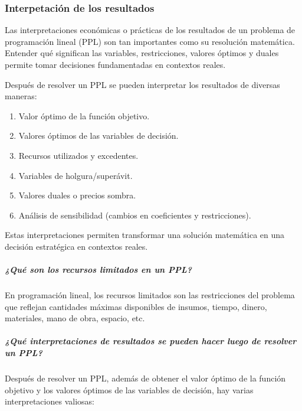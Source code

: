 \subsubsection{Interpetación de los resultados}

Las interpretaciones económicas o prácticas de los resultados de un problema de programación lineal (PPL) son tan importantes como su resolución matemática. Entender qué significan las variables, restricciones, valores óptimos y duales permite tomar decisiones fundamentadas en contextos reales.

Después de resolver un PPL se pueden interpretar los resultados de diversas maneras:
\begin{enumerate}
  \item Valor óptimo de la función objetivo.
  \item Valores óptimos de las variables de decisión.
  \item Recursos utilizados y excedentes.
  \item Variables de holgura/superávit.
  \item Valores duales o precios sombra.
  \item Análisis de sensibilidad (cambios en coeficientes y restricciones).
\end{enumerate}

Estas interpretaciones permiten transformar una solución matemática en una decisión estratégica en contextos reales.

\subparagraph{¿Qué son los recursos limitados en un PPL?}

En programación lineal, los recursos limitados son las restricciones del problema que reflejan cantidades máximas disponibles de insumos, tiempo, dinero, materiales, mano de obra, espacio, etc.

\subparagraph{¿Qué interpretaciones de resultados se pueden hacer luego de resolver un PPL?}

Después de resolver un PPL, además de obtener el valor óptimo de la función objetivo y los valores óptimos de las variables de decisión, hay varias interpretaciones valiosas:

